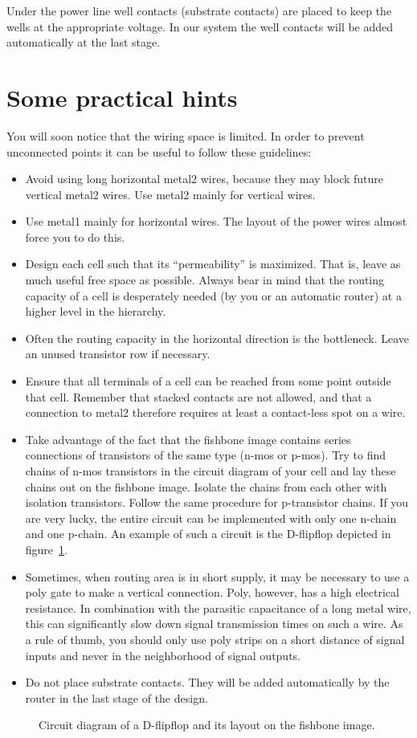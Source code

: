 Under the power line well contacts (substrate contacts) are placed to keep the
wells at the appropriate voltage. In our system the well contacts will be added
automatically at the last stage.

\section{Some practical hints}
You will soon notice that the wiring space is limited. In order to prevent
unconnected points it can be useful to follow these guidelines:
\begin{itemize}
\item
Avoid using long horizontal metal2 wires, because they may block future
vertical metal2 wires. Use metal2 mainly for vertical wires.
\item
Use metal1 mainly for horizontal wires. The layout of the power wires almost
force you to do this.
\item
Design each cell such that its ``permeability''
is maximized. That is, leave as much useful free space as possible. Always bear
in mind that the routing capacity of a cell is desperately needed (by you or an
automatic router) at a higher level in the hierarchy.
\item
Often the routing capacity in the horizontal direction is the bottleneck.
Leave an unused transistor row if necessary.
\item
Ensure that all terminals of a cell can be reached from some point outside that
cell. Remember that stacked contacts are not allowed, and that a connection to
metal2 therefore requires at least a contact-less spot on a wire.
\item
Take advantage of the fact that the fishbone image contains series connections
of transistors of the same type (n-mos or p-mos). Try to find chains of
n-mos transistors in the circuit diagram of your cell and lay these chains out
on the fishbone image. Isolate the chains from each other with isolation
transistors. Follow the same procedure for p-transistor chains. If you are very
lucky, the entire circuit can be implemented with only one n-chain and one
p-chain. An example of such a circuit is the D-flipflop depicted in
figure~\ref{f-dff}.
\item
Sometimes, when routing area is in short supply, it may be necessary to use a
poly gate to make a vertical connection. Poly, however, has a high electrical
resistance. In combination with the parasitic capacitance of a long metal wire,
this can significantly slow down signal transmission times on such a wire. As a
rule of thumb, you should only use poly strips on a short distance of signal
inputs and never in the neighborhood of signal outputs.
\item
Do not place substrate contacts. They will be added automatically by the router
in the last stage of the design.
\end{itemize}

\begin{figure}
\caption{Circuit diagram of a D-flipflop and its layout on the fishbone image.}
\label{f-dff}
\end{figure}



